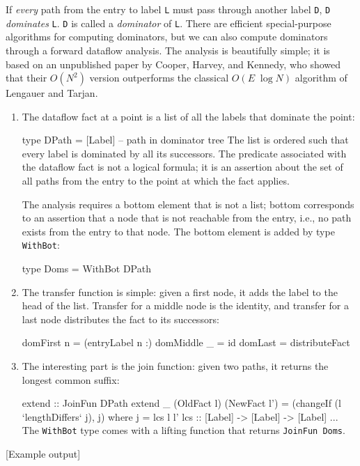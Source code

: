\documentclass[twocolumn]{article}
\newenvironment{code}{\par\unskip\kern-6pt \small\verbatim}{\endverbatim}
\begin{document}
If \emph{every} path from the entry to
label \texttt{L} must pass through another label \texttt{D},
\texttt{D} \emph{dominates} \texttt{L}.
\texttt{D} is called a \emph{dominator} of \texttt{L}.
There are efficient special-purpose
algorithms for computing dominators, but we can also compute
dominators through a forward dataflow analysis.
The analysis is beautifully simple; it is based on an unpublished
paper by Cooper, Harvey, and Kennedy, who showed that their $O(N^2)$ version
outperforms the classical $O(E\;\log N)$ algorithm of Lengauer and
Tarjan.
\begin{enumerate}
\item
The dataflow fact at a point is a list of all the labels that dominate
the point:
\begin{code}
type DPath = [Label] -- path in dominator tree
\end{code}
The list is ordered such that every label is dominated by all its
successors.
The predicate associated with the dataflow fact is not a logical
formula; it is an assertion about the set of all paths from the entry to
the point at which the fact applies.

The analysis requires a bottom element that is not a list;
bottom corresponds to an assertion that a node that is not reachable
from the entry, i.e., no path exists from the entry to that node.
The bottom element is added by type \texttt{WithBot}:
\begin{code}
type Doms = WithBot DPath
\end{code}
\item
The transfer function is simple: given a first node, it adds the label
to the head of the list.
Transfer for a middle node is the identity, and
transfer for a last node distributes the fact to its successors:
\begin{code}
domFirst n  = (entryLabel n :)
domMiddle _ = id
domLast     = distributeFact
\end{code}
\item
The interesting part is the join function:
given two paths, it returns the longest common suffix:
\begin{code}
extend :: JoinFun DPath
extend _ (OldFact l) (NewFact l')
  = (changeIf (l `lengthDiffers` j), j)
 where j = lcs l l'
       lcs :: [Label] -> [Label] -> [Label]
       ...
\end{code}
The \texttt{WithBot} type comes with a lifting function that returns
\texttt{JoinFun~Doms}.
\end{enumerate}

[Example output]
\end{document}
